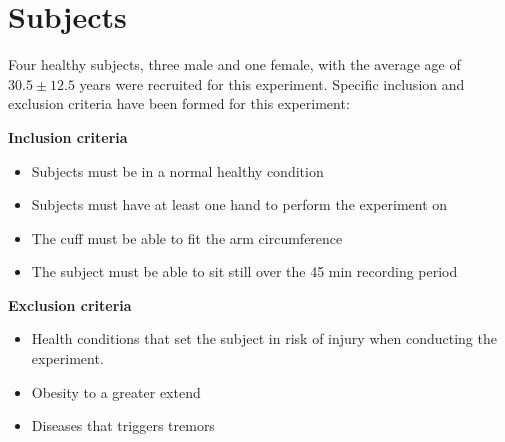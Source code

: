 \section{Subjects}

Four healthy subjects, three male and one female, with the average age of $30.5 \pm 12.5$ years were recruited for this experiment. Specific inclusion and exclusion criteria have been formed for this experiment:

\textbf{Inclusion criteria}
\begin{itemize}[noitemsep]
	\item Subjects must be in a normal healthy condition 
	\item Subjects must have at least one hand to perform the experiment on
	\item The cuff must be able to fit the arm circumference 
	\item The subject must be able to sit still over the 45 min recording period 
\end{itemize}

\textbf{Exclusion criteria}
\begin{itemize}[noitemsep]
	\item Health conditions that set the subject in risk of injury when conducting the experiment.
	
	\item Obesity to a greater extend
	\item Diseases that triggers tremors   
\end{itemize} 
